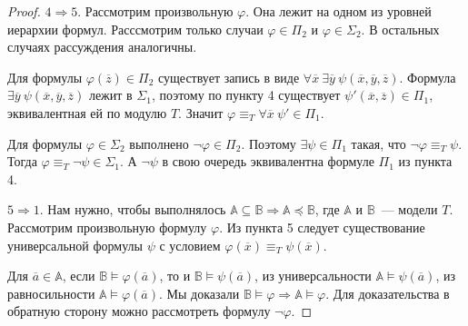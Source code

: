 \begin{proof}

    
    $4\Rightarrow 5$. Рассмотрим произвольную $\varphi$. Она лежит на одном из уровней иерархии формул. Расссмотрим только случаи $\varphi\in \Pi_2$ и $\varphi\in\Sigma_2$. В остальных случаях рассуждения аналогичны.

    Для формулы $\varphi(\overline{z})\in\Pi_2$ существует запись в виде $\forall \overline{x}~\exists \overline{y}~\psi(\overline{x}, \overline{y}, \overline{z})$. Формула $\exists \overline{y}~\psi(\overline{x}, \overline{y}, \overline{z})$ лежит в $\Sigma_1$, поэтому по пункту 4 существует $\psi'(\overline{x}, \overline{z})\in\Pi_1$, эквивалентная ей по модулю $T$. Значит $\varphi \equiv_T \forall \overline{x}~\psi' \in \Pi_1$.

    Для формулы $\varphi\in\Sigma_2$ выполнено $\neg\varphi\in\Pi_2$. Поэтому $\exists\psi\in\Pi_1$ такая, что $\neg\varphi \equiv_T \psi$. Тогда $\varphi\equiv_T\neg\psi\in\Sigma_1$. А $\neg\psi$ в свою очередь эквивалентна формуле $\Pi_1$ из пункта 4.

    $5 \Rightarrow 1$. Нам нужно, чтобы выполнялось $\mathbb{A} \subseteq \mathbb{B} \Rightarrow \mathbb{A} \preceq \mathbb{B}$, где $\mathbb{A}$ и $\mathbb{B}$~— модели $T$. Рассмотрим произвольную формулу $\varphi$. Из пункта 5 следует существование универсальной формулы $\psi$ с условием $\varphi(\overline{x}) \equiv_T \psi(\overline{x})$.


    Для $\overline{a}\in\mathbb{A}$, если $\mathbb{B} \models \varphi(\overline{a})$, то и $\mathbb{B} \models  \psi(\overline{a})$, из универсальности $\mathbb{A} \models \psi(\overline{a})$, из равносильности $\mathbb{A}\models\varphi(\overline{a})$. Мы доказали $\mathbb{B}\models\varphi\Rightarrow\mathbb{A}\models\varphi$. Для доказательства в обратную сторону можно рассмотреть формулу $\neg\varphi$.
\end{proof} 

